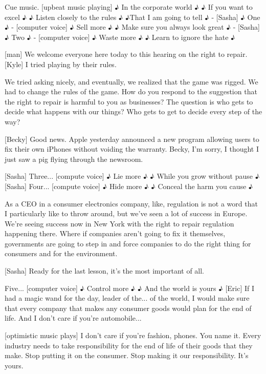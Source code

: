 \documentclass[a4paper]{article}
\begin{document}
	
	
	
	Cue music.
	[upbeat music playing]
	♪ In the corporate world ♪
	♪ If you want to excel ♪
	♪ Listen closely to the rules ♪
	♪That I am going to tell ♪
	- [Sasha] ♪ One ♪ - [computer voice] ♪ Sell more ♪
	♪ Make sure you always look great ♪
	- [Sasha] ♪ Two ♪ - [computer voice] ♪ Waste more ♪
	♪ Learn to ignore the hate ♪
	
	
	[man] We welcome everyone here today to this hearing on the right to repair.
	[Kyle] I tried playing by their rules.
	
	
	We tried asking nicely, and eventually, we realized that the game was rigged.
	We had to change the rules of the game.
	How do you respond to the suggestion that the right to repair is harmful to you as businesses?
	The question is who gets to decide what happens with our things?
	Who gets to get to decide every step of the way?
	
	
	[Becky] Good news.
	Apple yesterday announced a new program allowing users to fix their own iPhones without voiding the warranty.
	Becky, I'm sorry, I thought I just saw a pig flying through the newsroom.
	
	
	
	[Sasha] Three...
	[compute voice] ♪ Lie more ♪
	♪ While you grow without pause ♪
	[Sasha] Four...
	[compute voice] ♪ Hide more ♪
	♪ Conceal the harm you cause ♪
	
	
	As a CEO in a consumer electronics company, like, regulation is not a word that I particularly like to throw around, but we've seen a lot of success in Europe.
	We're seeing success now in New York with the right to repair regulation happening there.
	Where if companies aren't going to fix it themselves, governments are going to step in and force companies to do the right thing for consumers and for the environment.
	
	
	
	[Sasha] Ready for the last lesson, it's the most important of all.
	
	
	
	Five...
	[computer voice] ♪ Control more ♪
	♪ And the world is yours ♪
	[Eric] If I had a magic wand for the day,
	leader of the... of the world,
	I would make sure that every company that makes any consumer goods would plan for the end of life.
	And I don't care if you're automobile...
	
	
	[optimistic music plays]
	I don't care if you're fashion, phones.
	You name it.
	Every industry needs to take responsibility for the end of life of their goods that they make.
	Stop putting it on the consumer.
	Stop making it our responsibility.
	It's yours.
	
\end{document}
